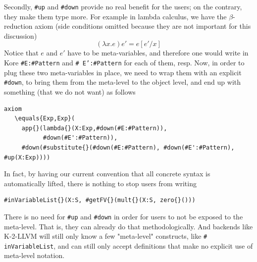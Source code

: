 \documentclass[UTF8,11pt]{article}
\theoremstyle{plain}
\theoremstyle{definition}
\theoremstyle{remark}
\newcommand{\sharpsymbol}{\#}
\newcommand{\sharpup}{\texttt{\sharpsymbol up}}
\newcommand{\sharpdown}{\texttt{\sharpsymbol down}}
\newcommand{\KPattern}{\texttt{\sharpsymbol Pattern}}
\begin{document}
Secondly, {\sharpup} and {\sharpdown} provide no real benefit for the users; on 
the contrary, they make them type more.
For example in lambda calculus, we have the $\beta$-reduction axiom (side 
conditions omitted because they are not important for this discussion)
$$(\lambda x . e)e' = e[e'/x]$$
Notice that $e$ and $e'$ have to be meta-variables, and therefore one would 
write in Kore {\texttt{\sharpsymbol E:\KPattern}} and {\texttt{\sharpsymbol 
E':\KPattern}} for each of them, resp.
Now, in order to plug these two meta-variables in place, we need to wrap them 
with an explicit {\sharpdown}, to bring them from the meta-level to the object 
level, and end up with something (that we do not want) as follows
\begin{lstlisting}[language=kore]
axiom
   \equals{Exp,Exp}(
     app{}(lambda{}(X:Exp,#down(#E:#Pattern)),
           #down(#E':#Pattern)),
     #down(#substitute{}(#down(#E:#Pattern), #down(#E':#Pattern), #up(X:Exp))))
\end{lstlisting}
In fact, by having our current convention that all concrete syntax is 
automatically lifted, there is nothing to stop users from writing
\begin{lstlisting}[language=kore]
    #inVariableList{}(X:S, #getFV{}(mult{}(X:S, zero{}()))
\end{lstlisting}
There is no need for 
{\sharpup} and {\sharpdown} in order for users to not be exposed 
to the meta-level.  That 
is, they can already do that methodologically. And backends like K-2-LLVM will 
still only know a few "meta-level" constructs, like \texttt{\sharpsymbol 
inVariableList{}}, and can still only 
accept definitions that make no explicit use of meta-level notation.
\end{document}
